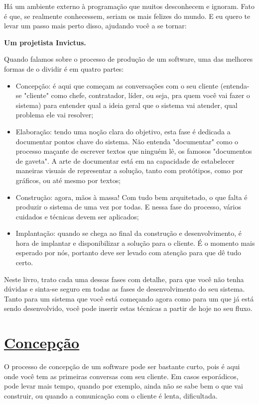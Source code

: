 \documentclass[a4paper, 12pt, oneside]{book}
\begin{document}
Há um ambiente externo à programação que muitos desconhecem e ignoram. Fato é que, se realmente conhecessem, seriam os mais felizes do mundo. E eu quero te levar um passo mais perto disso, ajudando você a se tornar:

\textbf{Um projetista Invictus.}

\noindent\makebox[\linewidth]{\rule{.5\paperwidth}{0.4pt}}

Quando falamos sobre o processo de produção de um software, uma das melhores formas de o dividir é em quatro partes:
\begin{itemize}
	\item Concepção: é aqui que começam as conversações com o seu cliente (entenda-se "cliente" como chefe, contratador, líder, ou seja, pra quem você vai fazer o sistema) para entender qual a ideia geral que o sistema vai atender, qual problema ele vai resolver;
	\item Elaboração: tendo uma noção clara do objetivo, esta fase é dedicada a documentar pontos chave do sistema. Não entenda "documentar" como o processo maçante de escrever textos que ninguém lê, os famosos "documentos de gaveta". A arte de documentar está em na capacidade de estabelecer maneiras visuais de representar a solução, tanto com protótipos, como por gráficos, ou até mesmo por textos;
	\item Construção: agora, mãos à massa! Com tudo bem arquitetado, o que falta é produzir o sistema de uma vez por todas. E nessa fase do processo, vários cuidados e técnicas devem ser aplicados;
	\item Implantação: quando se chega ao final da construção e desenvolvimento, é hora de implantar e disponibilizar a solução para o cliente. É o momento mais esperado por nós, portanto deve ser levado com atenção para que dê tudo certo.
\end{itemize}

Neste livro, trato cada uma dessas fases com detalhe, para que você não tenha dúvidas e sinta-se seguro em todas as fases de desenvolvimento do seu sistema. Tanto para um sistema que você está começando agora como para um que já está sendo desenvolvido, você pode inserir estas técnicas a partir de hoje no seu fluxo.

\chapter*{\underline{Concepção}}

O processo de concepção de um software pode ser bastante curto, pois é aqui onde você tem as primeiras conversas com seu cliente. Em casos esporádicos, pode levar mais tempo, quando por exemplo, ainda não se sabe bem o que vai construir, ou quando a comunicação com o cliente é lenta, dificultada.
\end{document}
